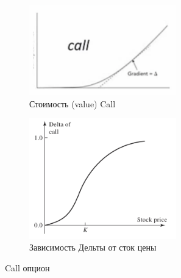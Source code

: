 \documentclass{article}
\begin{document}
  \begin{figure}[h]
 	\centering
 	\begin{subfigure}{.45\textwidth}
 		\centering
 			\includegraphics[width=0.7\textwidth]{value-call.jpg}
 			\caption{Стоимость (value) Call}
 			 	\label{model}
 	\end{subfigure}
 	 	\begin{subfigure}{.45\textwidth}
 		\centering
 		\includegraphics[width=0.7\textwidth]{delta-call.jpeg}
 		\caption{Зависимость Дельты от сток цены}
 			\label{model}
 		\end{subfigure}
 
 	\caption{Call опцион}
 	\label{model}
 \end{figure}
\bigskip
\end{document}
